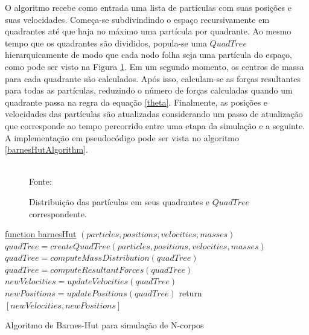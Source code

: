 \documentclass[rel_mlp]{iiufrgs}
\newcommand{\fonte}[1]{\\Fonte: {#1}}
\begin{document}
O algoritmo recebe como entrada uma lista de partículas com suas posições e suas velocidades. Começa-se subdivindindo o espaço recursivamente em quadrantes até que haja no máximo uma partícula por quadrante. Ao mesmo tempo que os quadrantes são divididos, popula-se uma $QuadTree$ hierarquicamente de modo que cada nodo folha seja uma partícula do espaço, como pode ser visto na Figura \ref{fig:quadtree.eps}. Em um segundo momento, os centros de massa para cada quadrante são calculados. Após isso, calculam-se as forças resultantes para todas as partículas, reduzindo o número de forças calculadas quando um quadrante passa na regra da equação \eqref{theta}. Finalmente, as posições e velocidades das partículas são atualizadas considerando um passo de atualização que corresponde ao tempo percorrido entre uma etapa da simulação e a seguinte. A implementação em pseudocódigo pode ser vista no algoritmo \ref{barnesHutAlgorithm}.


\begin{figure}[htb]
    \centering
    \caption{Distribuição das partículas em seus quadrantes e $QuadTree$ correspondente.}
    \label{fig:quadtree.eps}
    \fonte{\cite{galaxySimulator}}
\end{figure}


\begin{algorithm}
	\label{barnesHutAlgorithm}

    \underline{function barnesHut} $(particles, positions, velocities, masses)$\;
    $quadTree = createQuadTree(particles, positions, velocities, masses)$\;
    $quadTree = computeMassDistribution(quadTree)$\;
    $quadTree = computeResultantForces(quadTree)$\;
    $newVelocities = updateVelocities(quadTree)$\;
    $newPositions = updatePositions(quadTree)$\;
    return $[newVelocities, newPositions]$\;
    \caption{Algoritmo de Barnes-Hut para simulação de N-corpos}
\end{algorithm}
\end{document}
